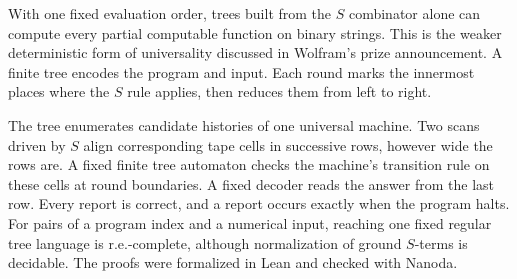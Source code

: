 With one fixed evaluation order, trees built from the $S$ combinator alone can compute every partial computable function on binary strings. This is the weaker deterministic form of universality discussed in Wolfram's prize announcement. A finite tree encodes the program and input. Each round marks the innermost places where the $S$ rule applies, then reduces them from left to right.

The tree enumerates candidate histories of one universal machine. Two scans driven by $S$ align corresponding tape cells in successive rows, however wide the rows are. A fixed finite tree automaton checks the machine's transition rule on these cells at round boundaries. A fixed decoder reads the answer from the last row. Every report is correct, and a report occurs exactly when the program halts. For pairs of a program index and a numerical input, reaching one fixed regular tree language is r.e.-complete, although normalization of ground $S$-terms is decidable. The proofs were formalized in Lean and checked with Nanoda.
